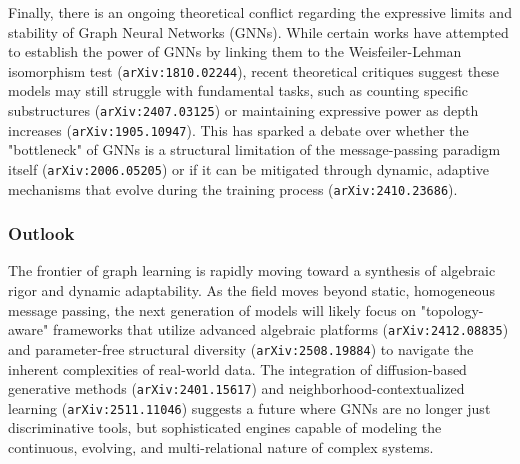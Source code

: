 \documentclass[11pt]{article}
\begin{document}
Finally, there is an ongoing theoretical conflict regarding the expressive limits and stability of Graph Neural Networks (GNNs). While certain works have attempted to establish the power of GNNs by linking them to the Weisfeiler-Lehman isomorphism test (\texttt{arXiv:1810.02244}), recent theoretical critiques suggest these models may still struggle with fundamental tasks, such as counting specific substructures (\texttt{arXiv:2407.03125}) or maintaining expressive power as depth increases (\texttt{arXiv:1905.10947}). This has sparked a debate over whether the "bottleneck" of GNNs is a structural limitation of the message-passing paradigm itself (\texttt{arXiv:2006.05205}) or if it can be mitigated through dynamic, adaptive mechanisms that evolve during the training process (\texttt{arXiv:2410.23686}).

\subsubsection{Outlook}

The frontier of graph learning is rapidly moving toward a synthesis of algebraic rigor and dynamic adaptability. As the field moves beyond static, homogeneous message passing, the next generation of models will likely focus on "topology-aware" frameworks that utilize advanced algebraic platforms (\texttt{arXiv:2412.08835}) and parameter-free structural diversity (\texttt{arXiv:2508.19884}) to navigate the inherent complexities of real-world data. The integration of diffusion-based generative methods (\texttt{arXiv:2401.15617}) and neighborhood-contextualized learning (\texttt{arXiv:2511.11046}) suggests a future where GNNs are no longer just discriminative tools, but sophisticated engines capable of modeling the continuous, evolving, and multi-relational nature of complex systems.
\end{document}
